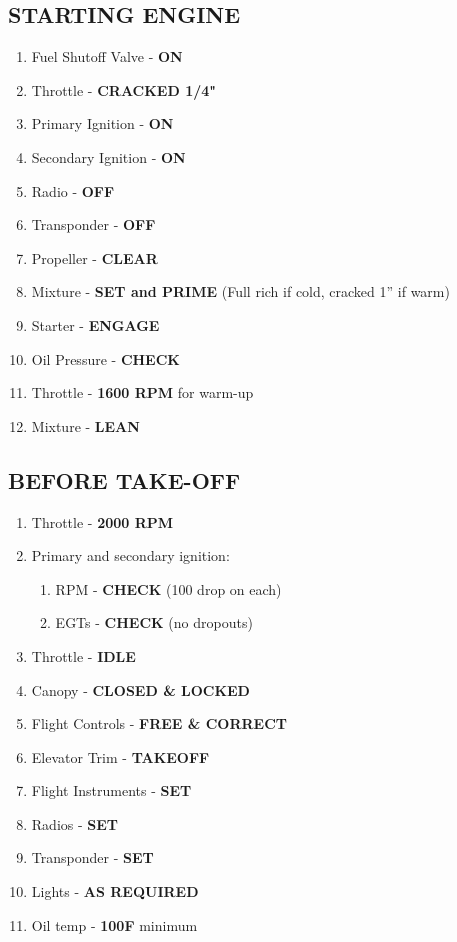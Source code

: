 \documentclass[14pt,letterpaper, twoside]{extarticle}
\begin{document}
\subsection{STARTING ENGINE}

\begin{enumerate}
\item Fuel Shutoff Valve - \textbf{ON}
\item Throttle - \textbf{CRACKED 1/4"}
\item Primary Ignition - \textbf{ON}
\item Secondary Ignition - \textbf{ON}
\item Radio - \textbf{OFF}
\item Transponder - \textbf{OFF}
\item Propeller - \textbf{CLEAR}
\item Mixture - \textbf{SET and PRIME} (Full rich if cold, cracked 1'' if warm)
\item Starter - \textbf{ENGAGE}
\item Oil Pressure - \textbf{CHECK}
\item Throttle - \textbf{1600 RPM} for warm-up
\item Mixture - \textbf{LEAN} 
\end{enumerate}

\subsection{BEFORE TAKE-OFF}

\begin{enumerate}
\item Throttle - \textbf{2000 RPM}
\item Primary and secondary ignition:
\begin{enumerate}
\item RPM - \textbf{CHECK} (100 drop on each)
\item EGTs - \textbf{CHECK} (no dropouts)
\end{enumerate}
\item Throttle - \textbf{IDLE}
\item Canopy - \textbf{CLOSED \& LOCKED}
\item Flight Controls - \textbf{FREE \& CORRECT}
\item Elevator Trim - \textbf{TAKEOFF}
\item Flight Instruments - \textbf{SET}
\item Radios - \textbf{SET}
\item Transponder - \textbf{SET}
\item Lights - \textbf{AS REQUIRED}
\item Oil temp - \textbf{100F} minimum
\end{enumerate}
	
\end{document}
